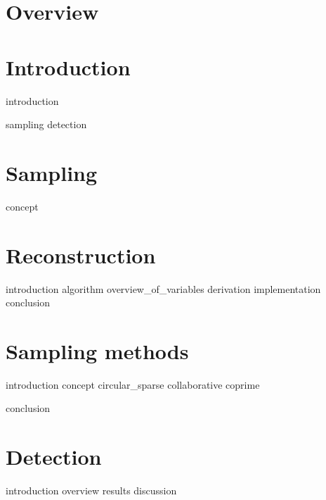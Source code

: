 \documentclass[a4paper, openany, oneside]{memoir}
\begin{document}
\chapter{Overview}

\chapter{Introduction}
{introduction}

{sampling}
{detection}


\chapter{Sampling}
\label{cha:sampling}

{concept}

\chapter{Reconstruction}
\label{cha:reconstruction}

{introduction}
{algorithm}
{overview_of_variables}
{derivation}
{implementation}
{conclusion}

\chapter{Sampling methods}
\label{cha:sampling_methods}

{introduction}
{concept}
{circular_sparse} 
{collaborative}
{coprime}

{conclusion}


\chapter{Detection}

{introduction}
{overview}
{results}
{discussion}
\end{document}
